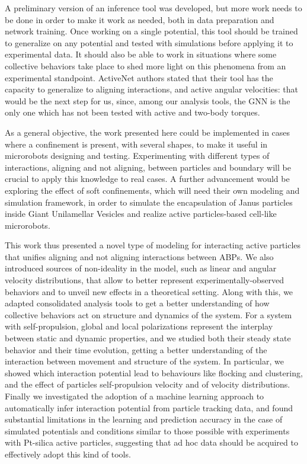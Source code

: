 \documentclass[../../master_thesis_np.tex]{subfiles}
\begin{document}
A preliminary version of an inference tool was developed, but more work needs to be done in order to make it work as needed, both in data preparation and network training.
Once working on a single potential, this tool should be trained to generalize on any potential and tested with simulations before applying it to experimental data.
It should also be able to work in situations where some collective behaviors take place to shed more light on this phenomena from an experimental standpoint.
ActiveNet \cite{ruiz-garcia_discovering_2024} authors stated that their tool has the capacity to generalize to aligning interactions, and active angular velocities: that would be the next step for us, since, among our analysis tools, the GNN is the only one which has not been tested with active and two-body torques.

As a general objective, the work presented here could be implemented in cases where a confinement is present, with several shapes, to make it useful in microrobots designing and testing.
Experimenting with different types of interactions, aligning and not aligning, between particles and boundary will be crucial to apply this knowledge to real cases.
A further advancement would be exploring the effect of soft confinements, which will need their own modeling and simulation framework, in order to simulate the encapsulation of Janus particles inside Giant Unilamellar Vesicles and realize active particles-based cell-like microrobots.

This work thus presented a novel type of modeling for interacting active particles that unifies aligning and not aligning interactions between ABPs.
We also introduced sources of non-ideality in the model, such as linear and angular velocity distributions, that allow to better represent experimentally-observed behaviors and to unveil new effects in a theoretical setting.
Along with this, we adapted consolidated analysis tools to get a better understanding of how collective behaviors act on structure and dynamics of the system.
For a system with self-propulsion, global and local polarizations represent the interplay between static and dynamic properties, and we studied both their steady state behavior and their time evolution, getting a better understanding of the interaction between movement and structure of the system.
In particular, we showed which interaction potential lead to behaviours like flocking and clustering, and the effect of particles self-propulsion velocity and of velocity distributions.
Finally we investigated the adoption of a machine learning approach to automatically infer interaction potential from particle tracking data, and found substantial limitations in the learning and prediction accuracy in the case of simulated potentials and conditions similar to those possible with experiments with Pt-silica active particles, suggesting that ad hoc data should be acquired to effectively adopt this kind of tools.
\end{document}
